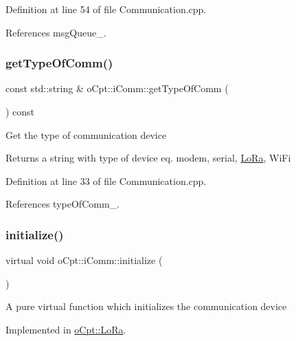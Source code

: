 Definition at line 54 of file Communication.\+cpp.



References msg\+Queue\+\_\+.

\hypertarget{classo_cpt_1_1i_comm_a75b8414ce6c41c5931d9e903ef573031}{}\label{classo_cpt_1_1i_comm_a75b8414ce6c41c5931d9e903ef573031} 
\subsubsection{\texorpdfstring{get\+Type\+Of\+Comm()}{getTypeOfComm()}}
{\footnotesize\ttfamily const std\+::string \& o\+Cpt\+::i\+Comm\+::get\+Type\+Of\+Comm (\begin{DoxyParamCaption}{ }\end{DoxyParamCaption}) const}

Get the type of communication device \begin{DoxyReturn}{Returns}
a string with type of device eq. modem, serial, \hyperlink{classo_cpt_1_1_lo_ra}{Lo\+Ra}, Wi\+Fi 
\end{DoxyReturn}


Definition at line 33 of file Communication.\+cpp.



References type\+Of\+Comm\+\_\+.

\hypertarget{classo_cpt_1_1i_comm_aeba385b1daaec5e64c5c573424ab8d24}{}\label{classo_cpt_1_1i_comm_aeba385b1daaec5e64c5c573424ab8d24} 
\subsubsection{\texorpdfstring{initialize()}{initialize()}}
{\footnotesize\ttfamily virtual void o\+Cpt\+::i\+Comm\+::initialize (\begin{DoxyParamCaption}{ }\end{DoxyParamCaption})\hspace{0.3cm}{\ttfamily [pure virtual]}}

A pure virtual function which initializes the communication device 

Implemented in \hyperlink{classo_cpt_1_1_lo_ra_aa0646143f843d43fcd680344dfcb2a14}{o\+Cpt\+::\+Lo\+Ra}.

\hypertarget{classo_cpt_1_1i_comm_a888e17cd4719170d4cc533ec4eaf1271}{}\label{classo_cpt_1_1i_comm_a888e17cd4719170d4cc533ec4eaf1271} 
